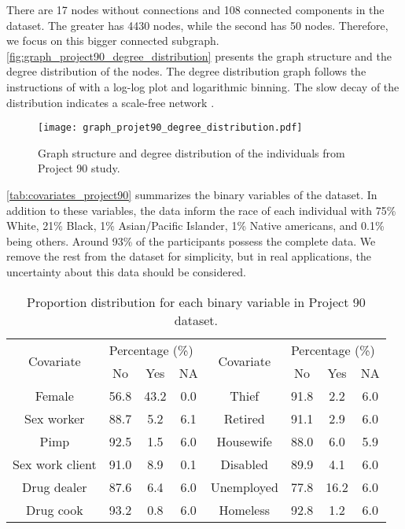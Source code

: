 There are 17 nodes without connections and 108 connected
components in the dataset. The greater has 4430 nodes, while the second has 50
nodes. Therefore, we focus on this bigger connected subgraph. \autoref{fig:graph_project90_degree_distribution} presents the
graph structure and the degree distribution of the nodes. The degree
distribution graph follows the instructions of \textcite[Advanced Topic
3.A]{barabasi2013network} with a log-log plot and logarithmic binning. The
slow decay of the distribution indicates a scale-free network \cite{barabasi2013network}.

\begin{figure}[htb]
    \centering
    \caption{\label{fig:graph_project90_degree_distribution}Graph structure and
    degree distribution of the individuals from Project 90 study.}
    \texttt{[image: graph\_projet90\_degree\_distribution.pdf]}
\end{figure}

\autoref{tab:covariates_project90} summarizes the binary variables of the
dataset. In addition to these variables, the data inform the race of each
individual with 75\% White, 21\%  Black, 1\% Asian/Pacific Islander, 1\%
Native americans, and 0.1\% being others. Around 93\% of the participants possess the
complete data. We remove the rest from the dataset for simplicity, 
but in real applications, the uncertainty about this data should be
considered.

\begin{table}[htbp]
    \centering
    \caption{\label{tab:covariates_project90}Proportion distribution for each
    binary variable in Project 90 dataset.}
    \begin{tabular}{cccccccc}
    \hline
    \multirow{2}{*}{Covariate} & \multicolumn{3}{l}{Percentage (\%)} & \multirow{2}{*}{Covariate} & \multicolumn{3}{l}{Percentage (\%)} \\ \cline{2-4} \cline{6-8} 
     & No & Yes & NA &  & No & Yes & NA \\ \hline
    Female & 56.8 & 43.2 & 0.0 & Thief & 91.8 & 2.2 & 6.0 \\
    Sex worker & 88.7 & 5.2 & 6.1 & Retired & 91.1 & 2.9 & 6.0 \\
    Pimp & 92.5 & 1.5 & 6.0 & Housewife & 88.0 & 6.0 & 5.9 \\
    Sex work client & 91.0 & 8.9 & 0.1 & Disabled & 89.9 & 4.1 & 6.0 \\
    Drug dealer & 87.6 & 6.4 & 6.0 & Unemployed & 77.8 & 16.2 & 6.0 \\
    Drug cook & 93.2 & 0.8 & 6.0 & Homeless & 92.8 & 1.2 & 6.0 \\ \hline
    \end{tabular}
\end{table}


